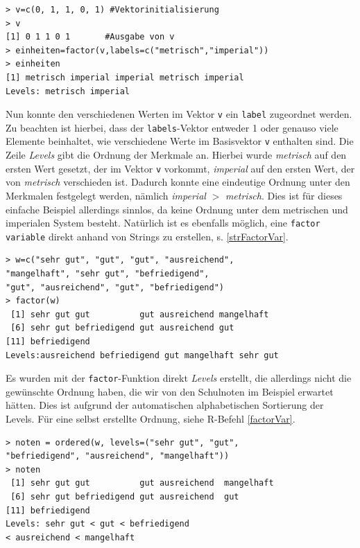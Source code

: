 \documentclass[a4paper, 12pt]{report} %
\begin{document}
\lstset{language=R}
\begin{lstlisting}[frame=single,caption={Erstellung einer \texttt{factor variable}}]
> v=c(0, 1, 1, 0, 1) #Vektorinitialisierung
> v
[1] 0 1 1 0 1		#Ausgabe von v
> einheiten=factor(v,labels=c("metrisch","imperial"))
> einheiten 
[1] metrisch imperial imperial metrisch imperial
Levels: metrisch imperial
\end{lstlisting}
\label{factorVar}

Nun konnte den verschiedenen Werten im Vektor \texttt{v} ein \texttt{label} zugeordnet werden. Zu beachten ist hierbei, dass der \texttt{labels}-Vektor entweder 1 oder genauso viele Elemente beinhaltet, wie verschiedene Werte im Basisvektor \texttt{v} enthalten sind. Die Zeile \textit{Levels} gibt die Ordnung der Merkmale an. Hierbei wurde \textit{metrisch} auf den ersten Wert gesetzt, der im Vektor \texttt{v} vorkommt, \textit{imperial} auf den ersten Wert, der von \textit{metrisch} verschieden ist. Dadurch konnte eine eindeutige Ordnung unter den Merkmalen festgelegt werden, nämlich \textit{imperial} $>$ \textit{metrisch}. Dies ist für dieses einfache Beispiel allerdings sinnlos, da keine Ordnung unter dem metrischen und imperialen System besteht.  Natürlich ist es ebenfalls möglich, eine \texttt{factor variable} direkt anhand von Strings zu erstellen, s. \ref{strFactorVar}.

\lstset{language=R}
\begin{lstlisting}[frame=single,caption={Erstellung einer \texttt{factor Variable} mit Strings}]
> w=c("sehr gut", "gut", "gut", "ausreichend", 
"mangelhaft", "sehr gut", "befriedigend", 
"gut", "ausreichend", "gut", "befriedigend")
> factor(w)
 [1] sehr gut gut          gut ausreichend mangelhaft  
 [6] sehr gut befriedigend gut ausreichend gut         
[11] befriedigend
Levels:ausreichend befriedigend gut mangelhaft sehr gut
\end{lstlisting}
\label{strFactorVar}

Es wurden mit der \texttt{factor}-Funktion direkt \textit{Levels} erstellt, die allerdings nicht die gewünschte Ordnung haben, die wir von den Schulnoten im Beispiel erwartet hätten. Dies ist aufgrund der automatischen alphabetischen Sortierung der Levels. Für eine selbst erstellte Ordnung, siehe R-Befehl \ref{factorVar}. 

\lstset{language=R}
\begin{lstlisting}[frame=single,caption={Ordnen einer selbsterstellten \texttt{factor Variable}}]
> noten = ordered(w, levels=("sehr gut", "gut", 
"befriedigend", "ausreichend", "mangelhaft"))
> noten
 [1] sehr gut gut          gut ausreichend  mangelhaft  
 [6] sehr gut befriedigend gut ausreichend  gut         
[11] befriedigend
Levels: sehr gut < gut < befriedigend 
< ausreichend < mangelhaft
\end{lstlisting}
\label{factorVar}
\end{document}
